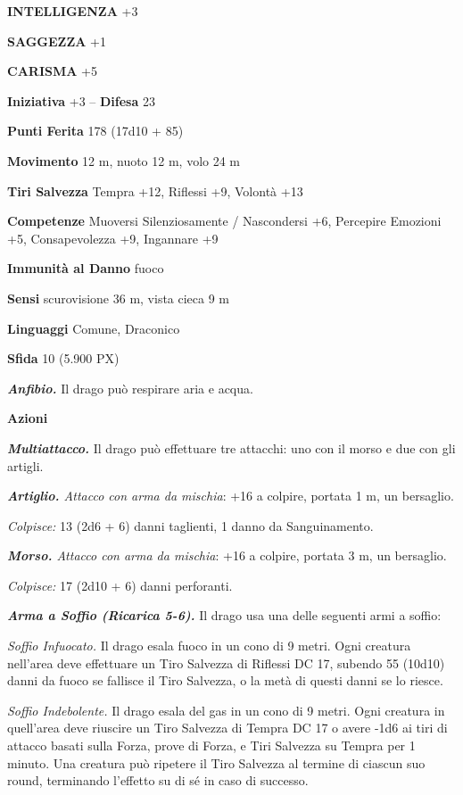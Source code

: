 \begin{multicols}{2}
	\textbf{INTELLIGENZA} +3

	\textbf{SAGGEZZA} +1

	\textbf{CARISMA} +5

	\textbf{Iniziativa} +3 -- \textbf{Difesa} 23

	\textbf{Punti Ferita} 178 (17d10 + 85)

	\textbf{Movimento} 12 m, nuoto 12 m, volo 24 m

	\textbf{Tiri Salvezza} Tempra +12, Riflessi +9, Volontà +13

	\textbf{Competenze} Muoversi Silenziosamente / Nascondersi +6, Percepire Emozioni +5, Consapevolezza +9, Ingannare +9

	\textbf{Immunità al Danno} fuoco

	\textbf{Sensi} scurovisione 36 m, vista cieca 9 m

	\textbf{Linguaggi} Comune, Draconico

	\textbf{Sfida} 10 (5.900 PX)

	\textit{\textbf{Anfibio.}} Il drago può respirare aria e acqua.

	\textbf{Azioni}

	\textit{\textbf{Multiattacco.}} Il drago può effettuare tre attacchi: uno con il morso e due con gli artigli.

	\textit{\textbf{Artiglio.} Attacco con arma da mischia}: +16 a colpire, portata 1 m, un bersaglio.

	\textit{Colpisce:} 13 (2d6 + 6) danni taglienti, 1 danno da Sanguinamento.

	\textit{\textbf{Morso.} Attacco con arma da mischia}: +16 a colpire, portata 3 m, un bersaglio.

	\textit{Colpisce:} 17 (2d10 + 6) danni perforanti.

	\textit{\textbf{Arma a Soffio (Ricarica 5-6).}} Il drago usa una delle seguenti armi a soffio:

	\textit{Soffio Infuocato.} Il drago esala fuoco in un cono di 9 metri. Ogni creatura nell'area deve effettuare un Tiro Salvezza di Riflessi DC 17, subendo 55 (10d10) danni da fuoco se fallisce il Tiro Salvezza, o la metà di questi danni se lo riesce.

	\textit{Soffio Indebolente.} Il drago esala del gas in un cono di 9 metri. Ogni creatura in quell'area deve riuscire un Tiro Salvezza di Tempra DC 17 o avere -1d6 ai tiri di attacco basati sulla Forza, prove di Forza, e Tiri Salvezza su Tempra per 1 minuto. Una creatura può ripetere il Tiro Salvezza al termine di ciascun suo round, terminando l'effetto su di sé in caso di successo.


\end{multicols}
